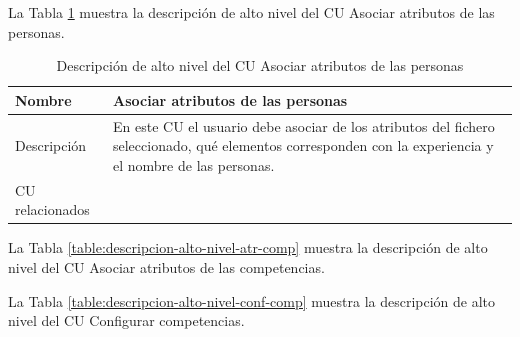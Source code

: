 La Tabla \ref{table:descripcion-alto-nivel-atr-pers} muestra la descripción de alto nivel del CU Asociar atributos de las personas.

\begin{table}[H]
	\centering
	\caption{Descripción de alto nivel del CU Asociar atributos de las personas} \label{table:descripcion-alto-nivel-atr-pers}
	\begin{tabular}{ | l | p{10cm} |}
		\toprule
		Nombre          & Asociar atributos de las personas                                                                                                                                                \\ \midrule
		Descripción     & En este CU el usuario debe asociar de los atributos del fichero seleccionado, qué elementos corresponden con la experiencia y el nombre de las personas. \\ \hline
		CU relacionados &  \\ \bottomrule
	\end{tabular}
\end{table}

La Tabla \ref{table:descripcion-alto-nivel-atr-comp} muestra la descripción de alto nivel del CU Asociar atributos de las competencias.

\begin{table}[H]
	\centering
	\caption{Descripción de alto nivel del CU Asociar atributos de las competencias} \label{table:descripcion-alto-nivel-atr-comp}
\end{table}


La Tabla \ref{table:descripcion-alto-nivel-conf-comp} muestra la descripción de alto nivel del CU Configurar competencias.

